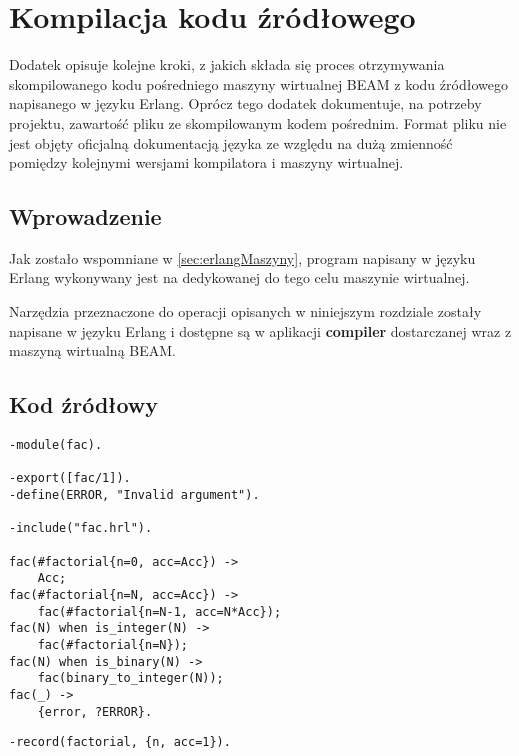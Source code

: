 \chapter{Kompilacja kodu źródłowego}
\label{cha:erlangKompilacja}

Dodatek opisuje kolejne kroki, z jakich składa się proces otrzymywania skompilowanego kodu pośredniego maszyny wirtualnej BEAM z kodu źródłowego napisanego w języku Erlang.
Oprócz tego dodatek dokumentuje, na potrzeby projektu, zawartość pliku ze skompilowanym kodem pośrednim.  Format pliku nie jest objęty oficjalną dokumentacją języka ze względu na dużą zmienność pomiędzy kolejnymi wersjami kompilatora i maszyny wirtualnej.

\section{Wprowadzenie}

Jak zostało wspomniane w \ref{sec:erlangMaszyny}, program napisany w języku Erlang wykonywany jest na dedykowanej do tego celu maszynie wirtualnej.

Narzędzia przeznaczone do operacji opisanych w niniejszym rozdziale zostały napisane w języku Erlang i dostępne są w aplikacji \textbf{compiler} dostarczanej wraz z maszyną wirtualną BEAM.
\section{Kod źródłowy}

\begin{lstlisting}[style=erlang, caption=Plik fac.erl, label=facERL]
-module(fac).

-export([fac/1]).
-define(ERROR, "Invalid argument").

-include("fac.hrl").

fac(#factorial{n=0, acc=Acc}) ->
    Acc;
fac(#factorial{n=N, acc=Acc}) ->
    fac(#factorial{n=N-1, acc=N*Acc});
fac(N) when is_integer(N) ->
    fac(#factorial{n=N});
fac(N) when is_binary(N) ->
    fac(binary_to_integer(N));
fac(_) ->
    {error, ?ERROR}.
\end{lstlisting}

\begin{lstlisting}[style=erlang, caption=Plik fac.hrl, label=facHRL]
-record(factorial, {n, acc=1}).
\end{lstlisting}

